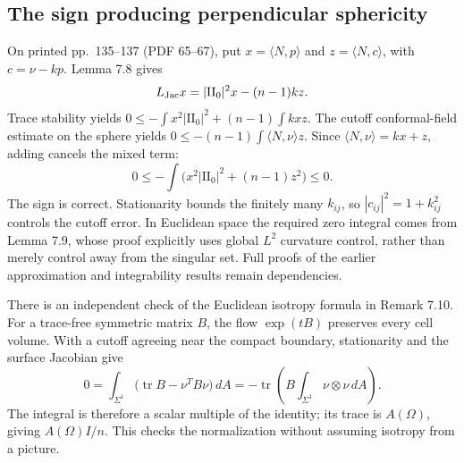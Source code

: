 \documentclass[10pt]{article}
\begin{document}
\subsection*{The sign producing perpendicular sphericity}
On printed pp. 135–137 (PDF 65–67), put \(x=\langle N,p\rangle\) and \(z=\langle N,c\rangle\), with \(c=\nu-kp\). Lemma 7.8 gives \[L_{\rm Jac}x=|\mathrm{II}_0|^2x-(n-1)kz.\] Trace stability yields \(0\leq-\int x^2|\mathrm{II}_0|^2+(n-1)\int kxz\). The cutoff conformal-field estimate on the sphere yields \(0\leq-(n-1)\int\langle N,\nu\rangle z\). Since \(\langle N,\nu\rangle=kx+z\), adding cancels the mixed term: \[0\leq-\int\bigl(x^2|\mathrm{II}_0|^2+(n-1)z^2\bigr)\leq0.\] The sign is correct. Stationarity bounds the finitely many \(k_{ij}\), so \(|c_{ij}|^2=1+k_{ij}^2\) controls the cutoff error. In Euclidean space the required zero integral comes from Lemma 7.9, whose proof explicitly uses global \(L^2\) curvature control, rather than merely control away from the singular set. Full proofs of the earlier approximation and integrability results remain dependencies.\par
There is an independent check of the Euclidean isotropy formula in Remark 7.10. For a trace-free symmetric matrix \(B\), the flow \(\exp(tB)\) preserves every cell volume. With a cutoff agreeing near the compact boundary, stationarity and the surface Jacobian give \[0=\int_{\Sigma^1}\bigl(\operatorname{tr}B-\nu^TB\nu\bigr)\,dA
   =-\operatorname{tr}\left(B\int_{\Sigma^1}\nu\otimes\nu\,dA\right).\] The integral is therefore a scalar multiple of the identity; its trace is \(A(\Omega)\), giving \(A(\Omega)I/n\). This checks the normalization without assuming isotropy from a picture.\par
\end{document}
